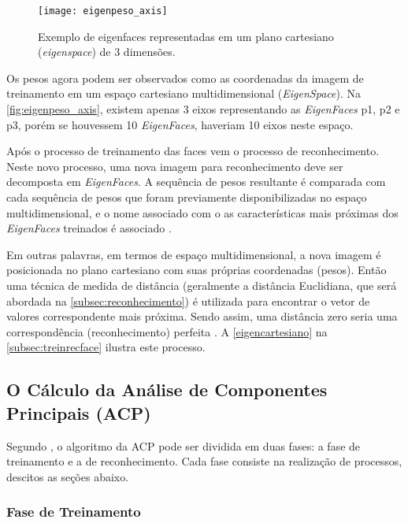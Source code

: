 \begin{figure}[h]
	\centering
	\texttt{[image: eigenpeso\_axis]}
	\caption{Exemplo de eigenfaces representadas em um plano cartesiano (\textit{eigenspace}) de 3 dimensões. }
	\label{fig:eigenpeso_axis}
\end{figure}

Os pesos agora podem ser observados como as coordenadas da imagem de treinamento em um espaço cartesiano multidimensional (\textit{EigenSpace}). Na \autoref{fig:eigenpeso_axis}, existem apenas 3 eixos representando as \textit{EigenFaces} p1, p2 e p3, porém se houvessem 10 \textit{EigenFaces}, haveriam 10 eixos neste espaço.

Após o processo de treinamento das faces vem o processo de reconhecimento. Neste novo processo, uma nova imagem para reconhecimento deve ser decomposta em \textit{EigenFaces}. A sequência de pesos resultante é comparada com cada sequência de pesos que foram previamente disponibilizadas no espaço multidimensional, e o nome associado com o as características mais próximas dos \textit{EigenFaces} treinados é associado \cite{drmathew_java_programming}.

Em outras palavras, em termos de espaço multidimensional, a nova imagem é posicionada no plano cartesiano com suas próprias coordenadas (pesos). Então uma técnica de medida de distância (geralmente a distância Euclidiana, que será abordada na \autoref{subsec:reconhecimento}) é utilizada para encontrar o vetor de valores correspondente mais próxima. Sendo assim, uma distância zero seria uma correspondência (reconhecimento) perfeita \cite{drmathew_java_programming}. A \autoref{eigencartesiano} na \autoref{subsec:treinrecface} ilustra este processo.



\subsection{O Cálculo da Análise de Componentes Principais (ACP)}\label{subsec:acp}

Segundo \cite{geysilva}, o algoritmo da ACP pode ser dividida em duas fases: a fase de treinamento e a de reconhecimento. Cada fase consiste na realização de processos, descitos as seções abaixo.

\subsubsection{Fase de Treinamento} \label{subsec:treinamento}

